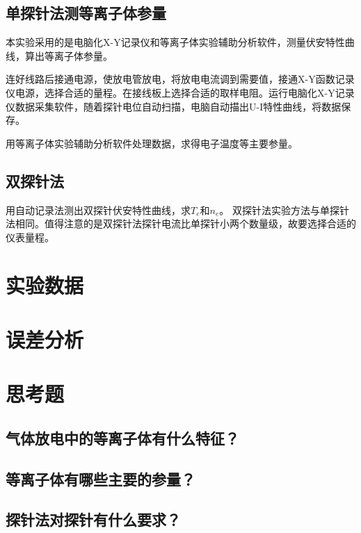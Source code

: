 \documentclass[a4paper]{article}
\begin{document}
\subsection{单探针法测等离子体参量}
本实验采用的是电脑化X-Y记录仪和等离子体实验辅助分析软件，测量伏安特性曲线，算出等离子体参量。

连好线路后接通电源，使放电管放电，将放电电流调到需要值，接通X-Y函数记录仪电源，选择合适的量程。在接线板上选择合适的取样电阻。运行电脑化X-Y记录仪数据采集软件，随着探针电位自动扫描，电脑自动描出U-I特性曲线，将数据保存。

用等离子体实验辅助分析软件处理数据，求得电子温度等主要参量。
\subsection{双探针法}
用自动记录法测出双探针伏安特性曲线，求$T_e$和$n_e$。
双探针法实验方法与单探针法相同。值得注意的是双探针法探针电流比单探针小两个数量级，故要选择合适的仪表量程。

\section{实验数据}

\section{误差分析}

\section{思考题}
\subsection{气体放电中的等离子体有什么特征？}
\subsection{等离子体有哪些主要的参量？}
\subsection{探针法对探针有什么要求？}

\nocite{jiaocai}

\end{document}
